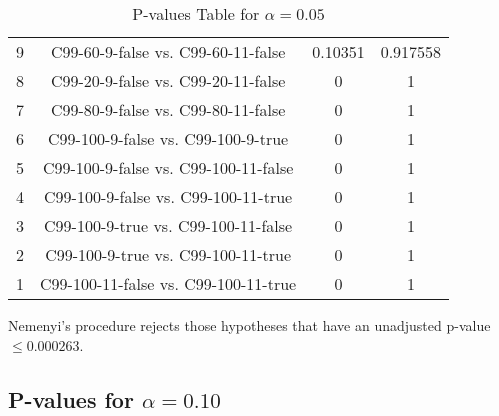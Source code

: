 \documentclass[a4paper,10pt]{article}
\begin{document}
\begin{landscape}
\begin{table}[!htp]
\begin{tabular}{cccc}
9&C99-60-9-false vs. C99-60-11-false&0.10351&0.917558\\
8&C99-20-9-false vs. C99-20-11-false&0&1\\
7&C99-80-9-false vs. C99-80-11-false&0&1\\
6&C99-100-9-false vs. C99-100-9-true&0&1\\
5&C99-100-9-false vs. C99-100-11-false&0&1\\
4&C99-100-9-false vs. C99-100-11-true&0&1\\
3&C99-100-9-true vs. C99-100-11-false&0&1\\
2&C99-100-9-true vs. C99-100-11-true&0&1\\
1&C99-100-11-false vs. C99-100-11-true&0&1\\
\hline
\end{tabular}
\caption{P-values Table for $\alpha=0.05$}
\end{table}Nemenyi's procedure rejects those hypotheses that have an unadjusted p-value $\le0.000263$.

\pagebreak

\subsection{P-values for $\alpha=0.10$}


\end{landscape}
\end{document}
